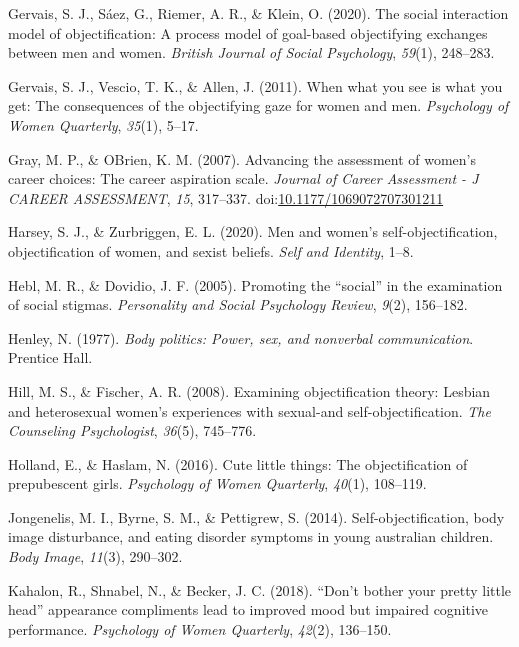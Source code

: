 \documentclass[man]{apa6}
\begin{document}
\hypertarget{ref-gervais2020social}{}
Gervais, S. J., Sáez, G., Riemer, A. R., \& Klein, O. (2020). The social
interaction model of objectification: A process model of goal-based
objectifying exchanges between men and women. \emph{British Journal of
Social Psychology}, \emph{59}(1), 248--283.

\hypertarget{ref-gervais2011you}{}
Gervais, S. J., Vescio, T. K., \& Allen, J. (2011). When what you see is
what you get: The consequences of the objectifying gaze for women and
men. \emph{Psychology of Women Quarterly}, \emph{35}(1), 5--17.

\hypertarget{ref-grayobrien2007}{}
Gray, M. P., \& OBrien, K. M. (2007). Advancing the assessment of
women's career choices: The career aspiration scale. \emph{Journal of
Career Assessment - J CAREER ASSESSMENT}, \emph{15}, 317--337.
doi:\href{https://doi.org/10.1177/1069072707301211}{10.1177/1069072707301211}

\hypertarget{ref-harsey2020men}{}
Harsey, S. J., \& Zurbriggen, E. L. (2020). Men and women's
self-objectification, objectification of women, and sexist beliefs.
\emph{Self and Identity}, 1--8.

\hypertarget{ref-hebl2005promoting}{}
Hebl, M. R., \& Dovidio, J. F. (2005). Promoting the ``social'' in the
examination of social stigmas. \emph{Personality and Social Psychology
Review}, \emph{9}(2), 156--182.

\hypertarget{ref-henley1977body}{}
Henley, N. (1977). \emph{Body politics: Power, sex, and nonverbal
communication}. Prentice Hall.

\hypertarget{ref-hill2008examining}{}
Hill, M. S., \& Fischer, A. R. (2008). Examining objectification theory:
Lesbian and heterosexual women's experiences with sexual-and
self-objectification. \emph{The Counseling Psychologist}, \emph{36}(5),
745--776.

\hypertarget{ref-holland2016}{}
Holland, E., \& Haslam, N. (2016). Cute little things: The
objectification of prepubescent girls. \emph{Psychology of Women
Quarterly}, \emph{40}(1), 108--119.

\hypertarget{ref-jongenelis2014}{}
Jongenelis, M. I., Byrne, S. M., \& Pettigrew, S. (2014).
Self-objectification, body image disturbance, and eating disorder
symptoms in young australian children. \emph{Body Image}, \emph{11}(3),
290--302.

\hypertarget{ref-kahalon2018don}{}
Kahalon, R., Shnabel, N., \& Becker, J. C. (2018). ``Don't bother your
pretty little head'' appearance compliments lead to improved mood but
impaired cognitive performance. \emph{Psychology of Women Quarterly},
\emph{42}(2), 136--150.
\end{document}
